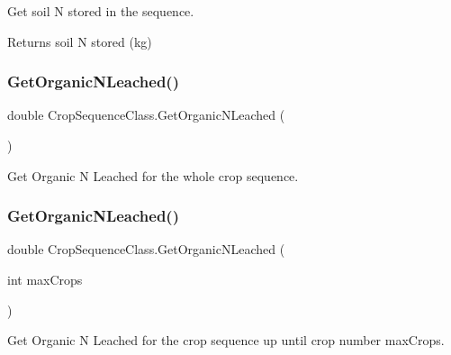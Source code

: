 Get soil N stored in the sequence. 

\begin{DoxyReturn}{Returns}
soil N stored (kg) 
\end{DoxyReturn}
\mbox{\label{class_crop_sequence_class_a8e17c89d14a240e2943ea26b4f60c1bd}} 
\subsubsection{\texorpdfstring{GetOrganicNLeached()}{GetOrganicNLeached()}\hspace{0.1cm}{\footnotesize\ttfamily [1/2]}}
{\footnotesize\ttfamily double Crop\+Sequence\+Class.\+Get\+Organic\+N\+Leached (\begin{DoxyParamCaption}{ }\end{DoxyParamCaption})\hspace{0.3cm}{\ttfamily [inline]}}



Get Organic N Leached for the whole crop sequence. 

\mbox{\label{class_crop_sequence_class_adcc7d7f3211236c6a93ab34d117f1a25}} 
\subsubsection{\texorpdfstring{GetOrganicNLeached()}{GetOrganicNLeached()}\hspace{0.1cm}{\footnotesize\ttfamily [2/2]}}
{\footnotesize\ttfamily double Crop\+Sequence\+Class.\+Get\+Organic\+N\+Leached (\begin{DoxyParamCaption}\item[{int}]{max\+Crops }\end{DoxyParamCaption})\hspace{0.3cm}{\ttfamily [inline]}}



Get Organic N Leached for the crop sequence up until crop number max\+Crops. 

\mbox{\label{class_crop_sequence_class_a5194164b45adf2baf7920142ce9af52d}} 
